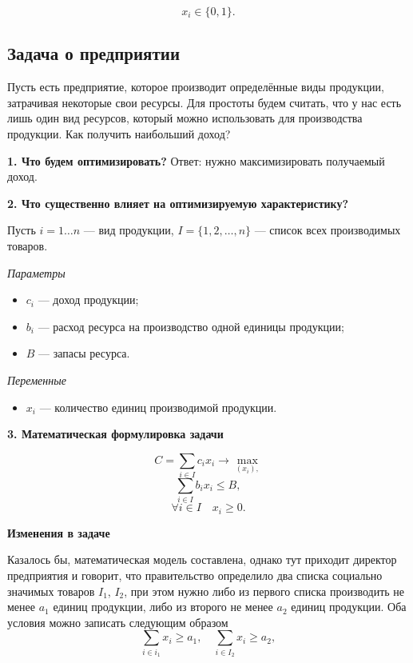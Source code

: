 \[
x_i \in \{0, 1\}.
\]

\subsection{Задача о предприятии}

\problem[о предприятии]

Пусть есть предприятие, которое производит определённые виды продукции, затрачивая некоторые свои ресурсы. Для простоты будем считать, что у нас есть лишь один вид ресурсов, который можно использовать для производства продукции. Как получить наибольший доход?

\bigskip

\textbf{1. Что будем оптимизировать?} Ответ: нужно максимизировать получаемый доход.

\bigskip

\textbf{2. Что существенно влияет на оптимизируемую характеристику?}

Пусть $i = 1 \dots n$ --- вид продукции, $I = \{1, 2, \dots, n\}$ --- список всех производимых товаров.

\bigskip

\textit{Параметры}

\begin{itemize}[nosep]
	\item $c_i$ --- доход продукции;
		
	\item $b_i$ --- расход ресурса на производство одной единицы продукции;
	
	\item $B$ --- запасы ресурса.
\end{itemize}

\bigskip

\textit{Переменные}
\begin{itemize}[nosep]
	\item $x_i$ --- количество единиц производимой продукции.
\end{itemize}

\bigskip

\textbf{3. Математическая формулировка задачи}

\[
C = \sum_{i \in I}c_i x_i \to \max_{(x_i),}
\]
\[
\sum_{i \in I}b_i x_i \le B,
\]
\[
\forall i \in I \quad x_i \ge 0.
\]

\textbf{Изменения в задаче}

Казалось бы, математическая модель составлена, однако тут приходит директор предприятия и говорит, что правительство определило два списка социально значимых товаров $I_1$, $I_2$, при этом нужно либо из первого списка производить не менее $a_1$ единиц продукции, либо из второго не менее $a_2$ единиц продукции. Оба условия можно записать следующим образом
\[
\sum_{i \in i_1} x_i \ge a_1, \quad \sum_{i \in I_2} x_i \ge a_2,
\]

